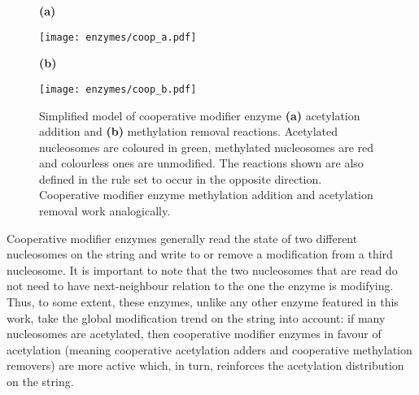                 \begin{figure}[htpb!]
                    \centering
                    \begin{minipage}[t][3cm]{\textwidth}
                        \begin{minipage}{0.15\textwidth}
                            \caption*{\small \textbf{(a)}}
                        \end{minipage}
                        \begin{minipage}{0.8\textwidth}
                            \texttt{[image: enzymes/coop\_a.pdf]}
                        \end{minipage}
                    \vfill
                        \begin{minipage}{0.15\textwidth}
                            \caption*{\small \textbf{(b)}}
                        \end{minipage}
                        \begin{minipage}{0.8\textwidth}
                            \texttt{[image: enzymes/coop\_b.pdf]}
                        \end{minipage}
                    \end{minipage}
                    \caption{Simplified model of cooperative modifier enzyme \textbf{(a)} acetylation addition and \textbf{(b)} methylation removal reactions. Acetylated nucleosomes are coloured in green, methylated nucleosomes are red and colourless ones are unmodified. The reactions shown are also defined in the rule set to occur in the opposite direction. Cooperative modifier enzyme methylation addition and acetylation removal work analogically.}
                    \label{img:coopEnzymes}
                \end{figure}

                Cooperative modifier enzymes generally read the state of two different nucleosomes on the string and write to or remove a modification from a third nucleosome. It is important to note that the two nucleosomes that are read do not need to have next-neighbour relation to the one the enzyme is modifying.  Thus, to some extent, these enzymes, unlike any other enzyme featured in this work, take the global modification trend on the string into account: if many nucleosomes are acetylated, then cooperative modifier enzymes in favour of acetylation (meaning cooperative acetylation adders and cooperative methylation removers) are more active which, in turn, reinforces the acetylation distribution on the string.


